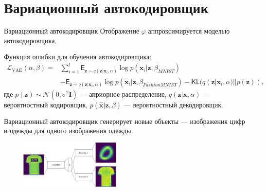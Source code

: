 \documentclass[10pt,pdf,hyperref={unicode}]{beamer}
\begin{document}
\section{Вариационный автокодировщик}
\begin{frame}{Вариационный автокодировщик}
\justifying
Отображение $\varphi$ аппроксимируется моделью автокодировщика.

Функция ошибки для обучения автокодировщика:
\[
\begin{aligned}
    \mathcal{L}_{\text{VAE}}(\alpha, \beta)=&\sum\limits_{i=1}^{l}\mathsf{E}_{\mathbf{z}\sim q(\mathbf{z}|\mathbf{x}_{i}, \alpha)}\log{p(\mathbf{x}_{i}|\mathbf{z}, \beta_{MNIST})}\\
    &+\mathsf{E}_{\mathbf{z}\sim q(\mathbf{z}|\mathbf{x}_{i}, \alpha)}\log{p(\mathbf{x}_{i}|\mathbf{z}, \beta_{FashionMNIST})}-\mathsf{KL}(q(\mathbf{z}|\mathbf{x}_{i}, \alpha) || p(\mathbf{z})),
\end{aligned}
\]
где
$p(\mathbf{z})\sim \mathcal{N}(0,\sigma^{2}\mathbf{I})$ --- априорное распределение, $q(\mathbf{z}|\mathbf{x}, \alpha)$ --- вероятностный кодировщик, $p(\hat{\mathbf{x}}|\mathbf{z}, \beta)$ --- вероятностный декодировщик.

Вариационный автокодировщик генерирует новые объекты --- изображения цифр и одежды для одного изображения одежды.

\begin{figure}[h!]
\includegraphics[width=0.45\textwidth]{results/VAE.png}
\end{figure}

\end{frame}

\end{document}
